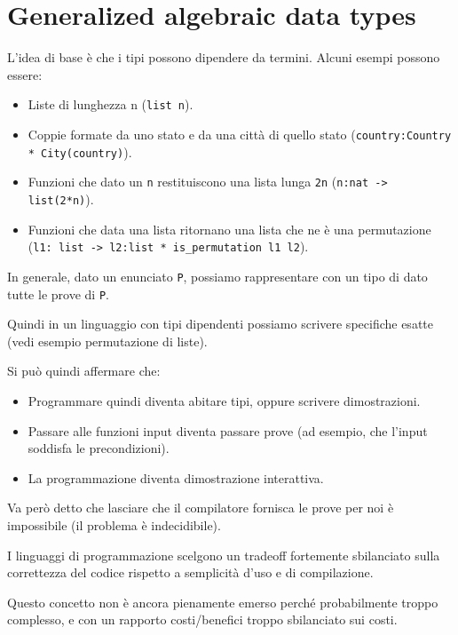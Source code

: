 \documentclass{article}
\begin{document}
\pagestyle{empty}

\section*{Generalized algebraic data types}
\large

L'idea di base è che i tipi possono dipendere da termini. Alcuni esempi possono essere:
\begin{itemize}
    \item Liste di lunghezza n (\texttt{list n}).
    \item Coppie formate da uno stato e da una città di quello stato (\texttt{country:Country * City(country)}).
    \item Funzioni che dato un \texttt{n} restituiscono una lista lunga \texttt{2n} (\texttt{n:nat -> list(2*n)}).
    \item Funzioni che data una lista ritornano una lista che ne è una permutazione \\(\texttt{l1: list -> l2:list * is\_permutation l1 l2}).
\end{itemize}

In generale, dato un enunciato \texttt{P}, possiamo rappresentare con un tipo di dato tutte le prove di \texttt{P}.

Quindi in un linguaggio con tipi dipendenti possiamo scrivere specifiche esatte (vedi esempio permutazione di liste).

Si può quindi affermare che:
\begin{itemize}
    \item Programmare quindi diventa abitare tipi, oppure scrivere dimostrazioni.
    \item Passare alle funzioni input diventa passare prove (ad esempio, che l’input soddisfa le precondizioni).
    \item La programmazione diventa dimostrazione interattiva.
\end{itemize}
Va però detto che lasciare che il compilatore fornisca le prove per noi è impossibile (il problema è indecidibile).

I linguaggi di programmazione scelgono un tradeoff fortemente sbilanciato sulla correttezza del codice rispetto a semplicità d’uso e di compilazione.

Questo concetto non è ancora pienamente emerso perché probabilmente troppo complesso, e con un rapporto costi/benefici troppo sbilanciato sui costi.
\end{document}
